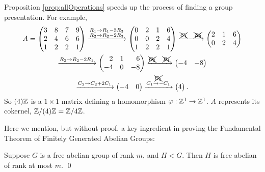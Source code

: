 \documentclass[../algebraNotesMSRI-UP2016.tex]{subfiles}
\begin{document}
\begin{frame}{}{}
\begin{ex}
Proposition \ref{prop:allOperations} speeds up the process of finding a group presentation.  For example,
\begin{multline*}
A=\begin{pmatrix}
	3 & 8 & 7 & 9 \\
	2 & 4 & 6 & 6 \\
	1 & 2 & 2 & 1
\end{pmatrix}\xrightarrow{\substack{R_1\to R_1-3R_3 \\ R_2\to R_2-2R_3}}
	\begin{pmatrix}
	0 & 2 & 1 & 6 \\
	0 & 0 & 2 & 4 \\
	1 & 2 & 2 & 1
	\end{pmatrix}\xrightarrow{\xcancel{C_1}\quad \xcancel{R_3}}
		\begin{pmatrix}
		2 & 1 & 6 \\
		0 & 2 & 4
		\end{pmatrix} \\
\xrightarrow{R_2\to R_2-2R_1}
	\begin{pmatrix*}[r]
	2 & 1 & 6 \\
	-4 & 0 & -8
	\end{pmatrix*}\xrightarrow{\xcancel{C_2}\quad \xcancel{R_1} }
		\begin{pmatrix}
		-4 & -8
		\end{pmatrix}  \\
\xrightarrow{C_2\to C_2+2C_1}
	\begin{pmatrix}
	-4 & 0 
	\end{pmatrix}\xrightarrow{\substack{\xcancel{C_2} \\ C_1\to -C_1}}
		\begin{pmatrix}
		4
		\end{pmatrix}.		
\end{multline*}
So $(4)\mathbb Z$ is a $1\times 1$ matrix defining a homomorphism $\varphi:\mathbb Z^1\to\mathbb Z^1$.  $A$ represents its cokernel, $\mathbb Z/(4)\mathbb Z=\mathbb Z/4\mathbb Z$. 
\end{ex}
\end{frame}

\begin{frame}[c]{}{}
Here we mention, but without proof, a key ingredient in proving the Fundamental Theorem of Finitely Generated Abelian Groups:

\smallGap
\begin{prop}
Suppose $G$ is a free abelian group of rank $m$, and $H<G$.  Then $H$ is free abelian of rank at most $m$.
\qed
\end{prop}
\end{frame}
\end{document}
